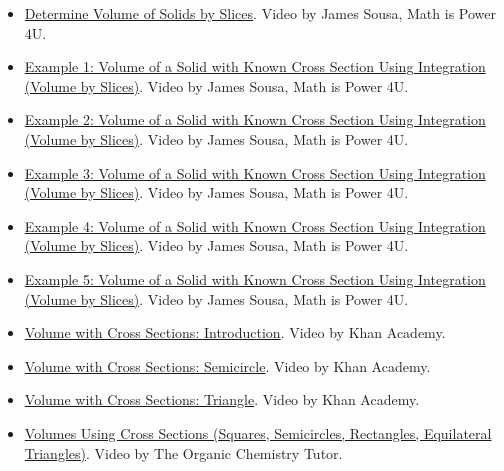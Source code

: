 \begin{itemize}

\item \href{https://youtu.be/Q8c8Gs1OUgk}{Determine Volume of Solids by Slices}.  
Video by James Sousa, Math is Power 4U.

\item \href{https://youtu.be/_QhW_pXy0wE}{Example 1: Volume of a Solid with Known Cross Section Using Integration (Volume by Slices)}.  
Video by James Sousa, Math is Power 4U.

\item \href{https://youtu.be/ODNdwqJ7TAg}{Example 2: Volume of a Solid with Known Cross Section Using Integration (Volume by Slices)}.  
Video by James Sousa, Math is Power 4U.

\item \href{https://youtu.be/LvBZ0jnAMbo}{Example 3: Volume of a Solid with Known Cross Section Using Integration (Volume by Slices)}.  
Video by James Sousa, Math is Power 4U.

\item \href{https://youtu.be/BQ5sg21w-lA}{Example 4: Volume of a Solid with Known Cross Section Using Integration (Volume by Slices)}.  
Video by James Sousa, Math is Power 4U.

\item \href{https://youtu.be/2OgAluEqd8s}{Example 5: Volume of a Solid with Known Cross Section Using Integration (Volume by Slices)}.  
Video by James Sousa, Math is Power 4U.

\item \href{https://www.youtube.com/watch?v=4vLy5VoUcQE}{Volume with Cross Sections: Introduction}.  
Video by Khan Academy.

\item \href{https://www.youtube.com/watch?v=tf4C8x8e7HQ}{Volume with Cross Sections: Semicircle}.  
Video by Khan Academy.

\item \href{https://www.youtube.com/watch?v=S-agS4YaxxU}{Volume with Cross Sections: Triangle}.  
Video by Khan Academy.

\item \href{https://youtu.be/XasIRTb5WH4}{Volumes Using Cross Sections (Squares, Semicircles, Rectangles, Equilateral Triangles)}.  
Video by The Organic Chemistry Tutor.

\end{itemize}

